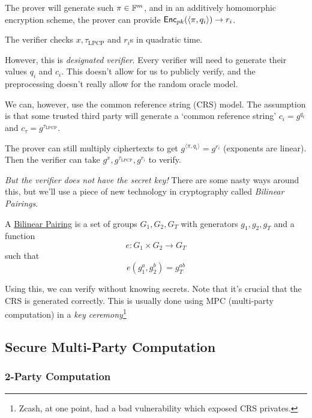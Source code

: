 The prover will generate such $\pi\in\mathbb F^m$, and in an additively homomorphic encryption scheme, the prover can provide $\operatorname{\mathsf{Enc}}_{pk}(\langle \pi, q_i\rangle)\rightarrow r_i$.

The verifier checks $x, \tau_\mathrm{LPCP}$ and $r_i$s in quadratic time.

However, this is \emph{designated verifier}. Every verifier will need to generate their values $q_i$ and $c_i$. This doesn't allow for us to publicly verify, and the preprocessing doesn't really allow for the random oracle model.


We can, however, use the common reference string (CRS) model. The assumption is that some trusted third party will generate a `common reference string' $c_i =g^{q_t}$ and $c_\tau = g^{\tau_\mathrm{LPCP}}$.

The prover can still multiply ciphertexts to get $g^{\langle\pi, q_i\rangle} = g^{r_i}$ (exponents are linear). Then the verifier can take $g^x, g^{\tau_\mathrm{LPCP}}, g^{r_i}$ to verify.

\emph{But the verifier does not have the secret key!} There are some nasty ways around this, but we'll use a piece of new technology in cryptography called \emph{Bilinear Pairings}.

\begin{definition}
    A \ul{Bilinear Pairing} is a set of groups $G_1, G_2, G_T$ with generators $g_1, g_2, g_T$ and a function
    \[e: G_1\times G_2\to G_T\]
    such that
    \[e(g_1^a, g_2^b) = g_T^{ab}\]
\end{definition}

Using this, we can verify without knowing secrets. Note that it's crucial that the CRS is generated correctly. This is usually done using MPC (multi-party computation) in a \emph{key ceremony}\footnote{Zcash, at one point, had a bad vulnerability which exposed CRS privates. }

\subsection{Secure Multi-Party Computation}

\subsubsection{2-Party Computation}

